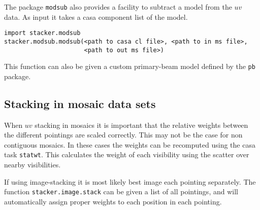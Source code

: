 \documentclass{article}
\begin{document}
The package {\tt modsub} also provides a facility to subtract a model from the $uv$ data.
As input it takes a casa component list of the model. 
\begin{verbatim}
import stacker.modsub
stacker.modsub.modsub(<path to casa cl file>, <path to in ms file>,
	                  <path to out ms file>)
\end{verbatim}
This function can also be given a custom primary-beam model defined by the {\tt pb} package.


\subsection{Stacking in mosaic data sets}
When $uv$ stacking in mosaics it is important that the relative weights between the different pointings are scaled correctly.
This may not be the case for non contiguous mosaics.
In these cases the weights can be recomputed using the casa task {\tt statwt}. 
This calculates the weight of each visibility using the scatter over nearby visibilities.

If using image-stacking it is most likely best image each pointing separately.
The function {\tt stacker.image.stack} can be given a list of all pointings,
and will automatically assign proper weights to each position in each pointing.



 
\end{document}
